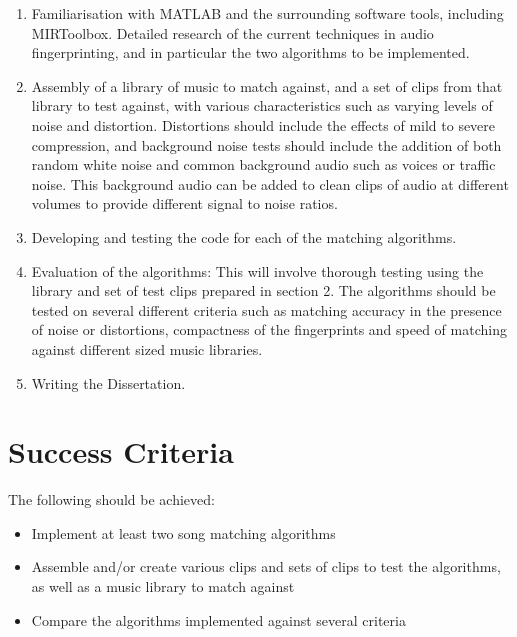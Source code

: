 \documentclass[12pt]{article}
\begin{document}
\begin{enumerate}

\item Familiarisation with MATLAB and the surrounding software tools, including MIRToolbox. Detailed research of the current techniques in audio fingerprinting, and in particular the two algorithms to be implemented. 

\item Assembly of a library of music to match against, and a set of clips from that library to test against, with various characteristics such as varying levels of noise and distortion. Distortions should include the effects of mild to severe compression, and background noise tests should include the addition of both random white noise and common background audio such as voices or traffic noise. This background audio can be added to clean clips of audio at different volumes to provide different signal to noise ratios.

\item Developing and testing the code for each of the matching algorithms.

\item Evaluation of the algorithms: This will involve thorough testing using the library and set of test clips prepared in section 2. The algorithms should be tested on several different criteria such as matching accuracy in the presence of noise or distortions, compactness of the fingerprints and speed of matching against different sized music libraries.

\item Writing the Dissertation.

\end{enumerate}


\section*{Success Criteria}

The following should be achieved:

\begin{itemize}

\item Implement at least two song matching algorithms

\item Assemble and/or create various clips and sets of clips to test the algorithms, as well as a music library to match against

\item Compare the algorithms implemented against several criteria

\end{itemize}
\end{document}
